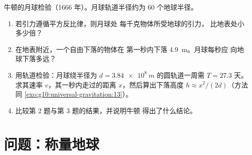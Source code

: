 \begin{exercise}[$\star\star\star$]\label{exo:g10:universal-gravitation:15}
牛顿的月球检验（1666 年）。月球轨道半径约为
$60$ 个地球半径。
\begin{enumerate}
  \item 若引力遵循平方反比律，则月球处
        每千克物体所受地球的引力，
        比地表处小多少倍？
  \item 在地表附近，一个自由下落的物体在
        第一秒内下落 \qty{4.9}{m}。月球每秒应
        向地球下落多远？
  \item 用轨道检验：月球绕半径为
        $d = \qty{3.84e8}{m}$ 的圆轨道一周需 $T = 27.3$ 天。求其速率
        $v$，其一秒内走过的距离 $x$，然后算出下落高度
        $h \approx x^2/(2d)$（方法同
        \cref{exo:g10:universal-gravitation:13}）。
  \item 比较第 2 题与第 3 题的结果，并说明牛顿
        得出了什么结论。
\end{enumerate}
\end{exercise}

\section{问题：称量地球}


